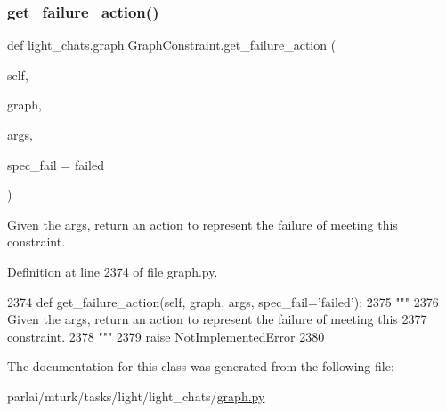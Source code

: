 \subsubsection{\texorpdfstring{get\+\_\+failure\+\_\+action()}{get\_failure\_action()}}
{\footnotesize\ttfamily def light\+\_\+chats.\+graph.\+Graph\+Constraint.\+get\+\_\+failure\+\_\+action (\begin{DoxyParamCaption}\item[{}]{self,  }\item[{}]{graph,  }\item[{}]{args,  }\item[{}]{spec\+\_\+fail = {\ttfamily \textquotesingle{}failed\textquotesingle{}} }\end{DoxyParamCaption})}

\begin{DoxyVerb}Given the args, return an action to represent the failure of meeting this
constraint.
\end{DoxyVerb}
 

Definition at line 2374 of file graph.\+py.


\begin{DoxyCode}
2374     \textcolor{keyword}{def }get\_failure\_action(self, graph, args, spec\_fail='failed'):
2375         \textcolor{stringliteral}{"""}
2376 \textcolor{stringliteral}{        Given the args, return an action to represent the failure of meeting this}
2377 \textcolor{stringliteral}{        constraint.}
2378 \textcolor{stringliteral}{        """}
2379         \textcolor{keywordflow}{raise} NotImplementedError
2380 
\end{DoxyCode}


The documentation for this class was generated from the following file\+:\begin{DoxyCompactItemize}
\item 
parlai/mturk/tasks/light/light\+\_\+chats/\hyperlink{parlai_2mturk_2tasks_2light_2light__chats_2graph_8py}{graph.\+py}\end{DoxyCompactItemize}
